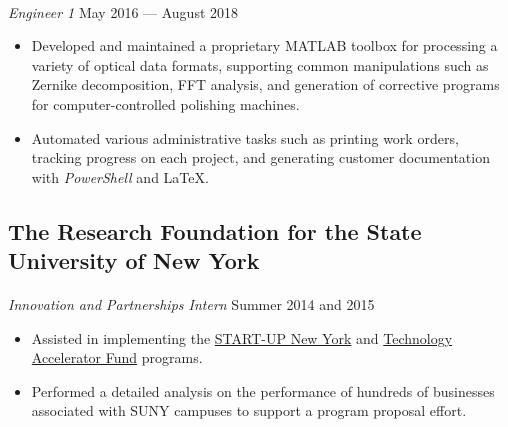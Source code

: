\documentclass[10pt]{article}
\begin{document}
\paragraph{}
\textit{Engineer 1} \hfill May 2016 --- August 2018
\begin{itemize}
  \item Developed and maintained a proprietary MATLAB toolbox for processing a
    variety of optical data formats, supporting common manipulations such as
    Zernike decomposition, FFT analysis, and generation of corrective programs
    for computer-controlled polishing machines.
  \item Automated various administrative tasks such as printing work orders,
    tracking progress on each project, and generating customer documentation
    with \textit{PowerShell} and \LaTeX.
\end{itemize}

\subsection*{The Research Foundation for the State University of New York}
\paragraph{}
\textit{Innovation and Partnerships Intern} \hfill Summer 2014 and 2015
\begin{itemize}
  \item Assisted in implementing the
    \href{https://esd.ny.gov/startup-ny-program}{START-UP New York} and
    \href{https://www.rfsuny.org/Our-Work/Innovation-and-Partnerships/Programs/Technology-Accelerator-Fund/}{Technology
    Accelerator Fund} programs.
  \item Performed a detailed analysis on the performance of hundreds of
    businesses associated with SUNY campuses to support a program proposal
    effort.
\end{itemize}
\end{document}
